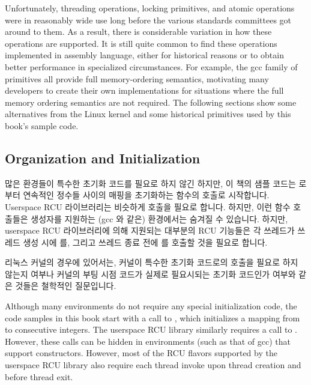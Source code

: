 Unfortunately, threading operations, locking primitives, and atomic
operations were in reasonably wide use long before the various standards
committees got around to them.
As a result, there is considerable variation in how these operations
are supported.
It is still quite common to find these operations implemented in
assembly language, either for historical reasons or to obtain better
performance in specialized circumstances.
For example, the gcc  family of primitives all
provide full memory-ordering semantics, motivating many developers to
create their own implementations for situations where the full memory
ordering semantics are not required.
The following sections show some alternatives from the Linux kernel
and some historical primitives used by this book's sample code.
\fi

\subsection{Organization and Initialization}
\label{sec:toolsoftrade:Organization and Initialization}

많은 환경들이 특수한 초기화 코드를 필요로 하지 않긴 하지만, 이 책의 샘플 코드는
 로부터 연속적인 정수들 사이의 매핑을 초기화하는 
함수의 호출로 시작합니다.
Userspace RCU 라이브러리는 비슷하게  호출을 필요로 합니다.
하지만, 이런 함수 호출들은 생성자를 지원하는 (gcc 와 같은) 환경에서는 숨겨질 수
있습니다.
하지만, userspace RCU 라이브러리에 의해 지원되는 대부분의 RCU 기능들은 각
쓰레드가 쓰레드 생성 시에  를, 그리고 쓰레드 종료
전에  를 호출할 것을 필요로 합니다.

리눅스 커널의 경우에 있어서는, 커널이 특수한 초기화 코드로의 호출을 필요로 하지
않는지 여부나 커널의 부팅 시점 코드가 실제로 필요시되는 초기화 코드인가 여부와
같은 것들은 철학적인 질문입니다.
\iffalse

Although many environments do not require any special initialization
code, the code samples in this book start with a call to ,
which initializes a mapping from  to consecutive integers.
The userspace RCU library similarly requires a call to .
However, these calls can be hidden in environments (such as that of
gcc) that support constructors.
However, most of the RCU flavors supported by the userspace RCU library
also require each thread invoke  upon thread
creation and  before thread exit.

